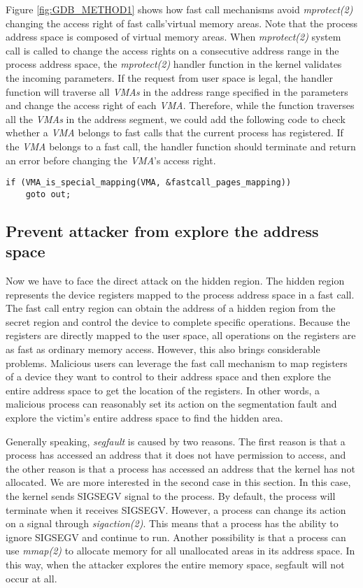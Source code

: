 Figure \ref{fig:GDB_METHOD1} shows how fast call mechanisms avoid \emph{mprotect(2)} 
changing the access right of fast calls'virtual memory areas. 
Note that the process address space is composed of virtual memory areas.  
When \emph{mprotect(2)} system call is called to change the access rights on a 
consecutive address range in the process address space, the \emph{mprotect(2)} 
handler function in the kernel validates the incoming parameters. 
If the request from user space is legal, the handler function will 
traverse all \emph{VMAs} in the address range specified in the parameters
 and change the access right of each \emph{VMA}. Therefore, while the function 
 traverses all the \emph{VMAs} in the address segment, we could add the following 
 code to check whether a \emph{VMA} belongs to fast calls that the current process 
 has registered. If the \emph{VMA} belongs to a fast call, the handler function 
 should terminate and return an error before changing the \emph{VMA}'s access right.

\begin{lstlisting}[style=CStyle]
  if (VMA_is_special_mapping(VMA, &fastcall_pages_mapping))
    goto out;
\end{lstlisting}
 

\subsection{Prevent attacker from explore the address space}
Now we have to face the direct attack on the hidden region. 
The hidden region represents the device registers mapped to the
 process address space in a fast call. The fast call entry region 
 can obtain the address of a  hidden region from the secret region and
  control the device to complete specific operations. Because the 
  registers are directly mapped to the user space, all operations 
  on the registers are as fast as ordinary memory access. However, 
  this also brings considerable problems. Malicious users can 
  leverage the fast call mechanism to map registers of a device 
  they want to control to their address space and then explore the 
  entire address space to get the location of the registers. 
  In other words, a malicious process can reasonably set its 
  action on the segmentation fault and explore the victim's 
  entire address space to find the hidden area.

Generally speaking, \emph{segfault} is caused by two reasons. 
The first reason is that a process has accessed an address 
that it does not have permission to access, and the other 
reason is that a process has accessed an address that the 
kernel has not allocated. We are more interested in the 
second case in this section. In this case, the kernel sends 
SIGSEGV signal to the process. By default,  the process will 
terminate when it receives SIGSEGV.  However, a process can 
change its action on a signal through \emph{sigaction(2)}. This 
means that a process has the ability to ignore SIGSEGV 
and continue to run. Another possibility is that a process 
can use \emph{mmap(2)} to allocate memory for all unallocated 
areas in its address space. In this way, when the attacker 
explores the entire memory space, segfault will not occur at all.

